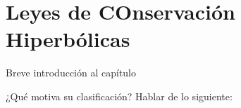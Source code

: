 \chapter{Leyes de COnservación Hiperbólicas}\label{cap:Leyes}

Breve introducción al capítulo

¿Qué motiva su clasificación? Hablar de lo siguiente:

\section{}

